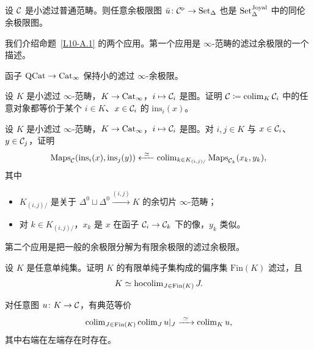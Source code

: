 
\begin{proposition}\label{L10-A.1}
设 $\mathcal{C}$ 是小滤过普通范畴。则任意余极限图 $\bar u\colon\mathcal{C}^{\triangleright}\to\operatorname{Set}_\Delta$ 也是 $\operatorname{Set}^{\mathrm{Joyal}}_\Delta$ 中的同伦余极限图。
\end{proposition}

\nitem\label{L10-A.2} 我们介绍命题~\ref{L10-A.1} 的两个应用。第一个应用是 $\infty$-范畴的滤过余极限的一个描述。

\begin{exercise}\label{L10-A.3}
函子 $\mathrm{QCat}\to\operatorname{Cat}_\infty$ 保持小的滤过 $\infty$-余极限。
\end{exercise}

\begin{exercise}\label{L10-A.4}
设 $K$ 是小滤过 $\infty$-范畴，$K\to\operatorname{Cat}_\infty$，$i\mapsto\mathcal{C}_i$ 是图。证明 $\mathcal{C}\coloneqq\operatorname{colim}_K\mathcal{C}_i$ 中的任意对象都等价于某个 $i\in K$、$x\in\mathcal{C}_i$ 的 $\mathrm{ins}_i(x)$。
\end{exercise}

\begin{exercise}\label{L10-A.5}
设 $K$ 是小滤过 $\infty$-范畴，$K\to\operatorname{Cat}_\infty$，$i\mapsto\mathcal{C}_i$ 是图。对 $i,j\in K$ 与 $x\in\mathcal{C}_i$、$y\in\mathcal{C}_j$，证明
\[
\operatorname{Maps}_\cC(\mathrm{ins}_i(x),\mathrm{ins}_j(y))\xleftarrow{\ \simeq\ }\colim_{k\in K_{(i,j)/}}\operatorname{Maps}_{\cC_k}(x_k,y_k),
\]
其中
\begin{itemize}[leftmargin=2.2em,itemsep=0.1em]
\item $K_{(i,j)/}$ 是关于 $\Delta^0\sqcup\Delta^0\xrightarrow{(i,j)}K$ 的余切片 $\infty$-范畴；
\item 对 $k\in K_{(i,j)/}$，$x_k$ 是 $x$ 在函子 $\mathcal{C}_i\to\mathcal{C}_k$ 下的像，$y_k$ 类似。
\end{itemize}
\end{exercise}

\nitem\label{L10-A.6} 第二个应用是把一般的余极限分解为有限余极限的滤过余极限。

\begin{exercise}\label{L10-A.7}
设 $K$ 是任意单纯集。证明 $K$ 的有限单纯子集构成的偏序集 $\mathrm{Fin}(K)$ 滤过，且
\[
K\simeq\operatorname{hocolim}_{J\in\mathrm{Fin}(K)}J.
\]
\end{exercise}

\begin{exercise}\label{L10-A.8}
对任意图 $u\colon K\to\mathcal{C}$，有典范等价
\[
\operatorname{colim}_{J\in\mathrm{Fin}(K)}\operatorname{colim}_J u|_J\xrightarrow{\ \simeq\ }\operatorname{colim}_K u,
\]
其中右端在左端存在时存在。
\end{exercise}

